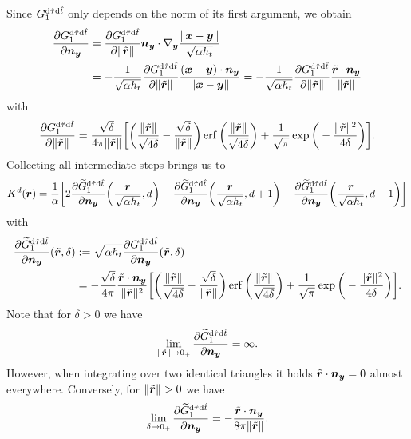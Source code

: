 \documentclass[a4paper,11pt]{article}
\begin{document}
Since $G^{{\mathrm{d}}\hat\tau{\mathrm{d}}\hat t}_1$ only depends on the norm of its first argument, we obtain
\begin{equation}
\label{eq:dn_G_dt_dtau}
\begin{aligned}
  \frac{\partial G^{{\mathrm{d}}\hat\tau{\mathrm{d}}\hat t}_1}{\partial {\ensuremath{{\bm{n}}}}_{{\bm{y}}}} &= \frac{\partial G^{{\mathrm{d}}\hat\tau{\mathrm{d}}\hat t}_1}{\partial \|\tilde {{{\bm{r}}}}\|} {{\bm{n}}}_{{\bm{y}}} \cdot \nabla_{{\bm{y}}} \frac{\|{{\bm{x}}}-{{\bm{y}}}\|}{\sqrt{\alpha h_t}} \\
  &= -\frac{1}{\sqrt{\alpha h_t}} \frac{\partial G^{{\mathrm{d}}\hat\tau{\mathrm{d}}\hat t}_1}{\partial \|\tilde {{{\bm{r}}}}\|} \frac{({{\bm{x}}}-{{\bm{y}}})\cdot {\ensuremath{{\bm{n}}}}_{{\bm{y}}}}{\|{{\bm{x}}}-{{\bm{y}}}\|} = -\frac{1}{\sqrt{\alpha h_t}} \frac{\partial G^{{\mathrm{d}}\hat\tau{\mathrm{d}}\hat t}_1}{\partial \|\tilde {{{\bm{r}}}}\|} \frac{\tilde {{{\bm{r}}}} \cdot {\ensuremath{{\bm{n}}}}_{{\bm{y}}}}{\|\tilde {{{\bm{r}}}}\|}
\end{aligned}
\end{equation}
with
\begin{equation*}
  \frac{\partial G^{{\mathrm{d}}\hat\tau{\mathrm{d}}\hat t}_1}{\partial \|\tilde {{{\bm{r}}}}\|} =\frac{\sqrt{\delta}}{4\pi\|\tilde {{{\bm{r}}}}\|} \bigg[  \bigg( \frac{\|\tilde {{{\bm{r}}}}\|}{\sqrt{4\delta}} - \frac{\sqrt{\delta}}{\|\tilde {{{\bm{r}}}}\|} \bigg) \operatorname{erf}\bigg( \frac{\|\tilde {{{\bm{r}}}}\|}{\sqrt{4\delta}} \bigg) + \frac{1}{\sqrt{\pi}} \exp \bigg( -\frac{\|\tilde {{{\bm{r}}}}\|^2}{4\delta} \bigg) \bigg].
\end{equation*}
Collecting all intermediate steps brings us to
\begin{align*}
  K^d({{\bm{r}}}) = \frac{1}{\alpha} \bigg[ 2 \frac{\partial \widetilde G^{{\mathrm{d}}\hat\tau{\mathrm{d}}\hat t}_1}{\partial {\ensuremath{{\bm{n}}}}_{{\bm{y}}}} \bigg(\frac{{{\bm{r}}}}{\sqrt{\alpha h_t}},d\bigg) - \frac{\partial \widetilde G^{{\mathrm{d}}\hat\tau{\mathrm{d}}\hat t}_1}{\partial {\ensuremath{{\bm{n}}}}_{{\bm{y}}}}\bigg(\frac{{{\bm{r}}}}{\sqrt{\alpha h_t}},d+1\bigg) - \frac{\partial \widetilde G^{{\mathrm{d}}\hat\tau{\mathrm{d}}\hat t}_1}{\partial {\ensuremath{{\bm{n}}}}_{{\bm{y}}}}\bigg(\frac{{{\bm{r}}}}{\sqrt{\alpha h_t}},d-1\bigg) \bigg]
\end{align*}
with
\begin{align*}
  \frac{\partial \widetilde G^{{\mathrm{d}}\hat\tau{\mathrm{d}}\hat t}_1}{\partial {\ensuremath{{\bm{n}}}}_{{\bm{y}}}}(\tilde {{{\bm{r}}}},\delta) &:= \sqrt{\alpha h_t}\frac{\partial G^{{\mathrm{d}}\hat\tau{\mathrm{d}}\hat t}_1}{\partial {\ensuremath{{\bm{n}}}}_{{\bm{y}}}}(\tilde {{{\bm{r}}}},\delta) \\
  &= - \frac{\sqrt{\delta}}{4\pi} \frac{\tilde {{{\bm{r}}}} \cdot {\ensuremath{{\bm{n}}}}_{{\bm{y}}}}{\|\tilde {{{\bm{r}}}}\|^2} \bigg[  \bigg( \frac{\|\tilde {{{\bm{r}}}}\|}{\sqrt{4\delta}} - \frac{\sqrt{\delta}}{\|\tilde {{{\bm{r}}}}\|} \bigg) \operatorname{erf}\bigg( \frac{\|\tilde {{{\bm{r}}}}\|}{\sqrt{4\delta}} \bigg) + \frac{1}{\sqrt{\pi}} \exp \bigg( -\frac{\|\tilde {{{\bm{r}}}}\|^2}{4\delta} \bigg) \bigg].
\end{align*}
Note that for $\delta > 0$ we have
\begin{equation*}
  \lim_{\|\tilde {{{\bm{r}}}}\| \to 0_+} \frac{\partial \widetilde G^{{\mathrm{d}}\hat\tau{\mathrm{d}}\hat t}_1}{\partial {\ensuremath{{\bm{n}}}}_{{\bm{y}}}} = \infty.
\end{equation*}
However, when integrating over two identical triangles it holds $\tilde {{{\bm{r}}}} \cdot {\ensuremath{{\bm{n}}}}_{{\bm{y}}} = 0$ almost everywhere.  Conversely, for $\|\tilde \vr\|>0$ we have
\begin{equation*}
  \lim_{\delta \to 0_+} \frac{\partial \widetilde G^{{\mathrm{d}}\hat\tau{\mathrm{d}}\hat t}_1}{\partial {\ensuremath{{\bm{n}}}}_{{\bm{y}}}} = -\frac{\tilde {{{\bm{r}}}} \cdot {\ensuremath{{\bm{n}}}}_{{\bm{y}}}}{8 \pi \|\tilde {{{\bm{r}}}}\|}.
\end{equation*}
\end{document}
